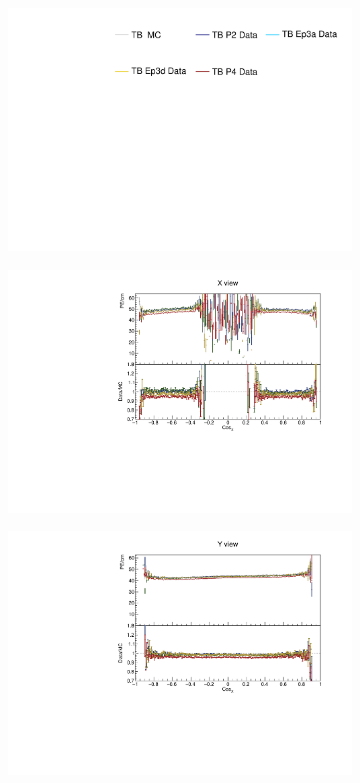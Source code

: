 \begin{figure}[!ht]
  \begin{subfigure}{\textwidth}
  \centering
    \includegraphics[height=0.2\linewidth]{essentialsec_tb/legend.pdf}
  \end{subfigure}
  \vspace*{2mm}

  \begin{subfigure}{0.5\textwidth}
    \includegraphics[width=\linewidth]{PlotsAngularDistribution/pecm_cosx_x.pdf}
  \end{subfigure}
  \begin{subfigure}{0.5\textwidth}
    \includegraphics[width=\linewidth]{PlotsAngularDistribution/pecm_cosx_y.pdf}

\end{subfigure}
\end{figure}
